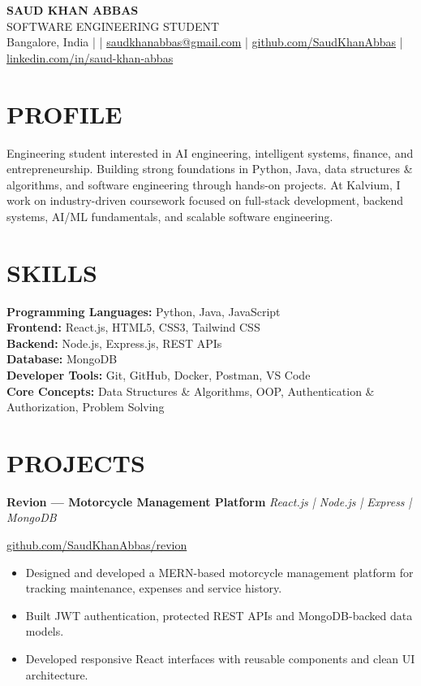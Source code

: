 \documentclass[11pt,a4paper]{article}
\begin{document}
\begin{center}
{\LARGE\bfseries SAUD KHAN ABBAS}\\[3pt]
{\large SOFTWARE ENGINEERING STUDENT}\\[7pt]

Bangalore, India \;| \;|\;
\href{mailto:saudkhanabbas@gmail.com}{saudkhanabbas@gmail.com}
\;|\;
\href{https://github.com/SaudKhanAbbas}{github.com/SaudKhanAbbas}
\;|\;
\href{https://linkedin.com/in/saud-khan-abbas}{linkedin.com/in/saud-khan-abbas}
\end{center}

\section*{PROFILE}
Engineering student interested in AI engineering, intelligent systems, finance, and entrepreneurship. Building strong foundations in Python, Java, data structures \& algorithms, and software engineering through hands-on projects. At Kalvium, I work on industry-driven coursework focused on full-stack development, backend systems, AI/ML fundamentals, and scalable software engineering.

\section*{SKILLS}
\textbf{Programming Languages:} Python, Java, JavaScript\\
\textbf{Frontend:} React.js, HTML5, CSS3, Tailwind CSS\\
\textbf{Backend:} Node.js, Express.js, REST APIs\\
\textbf{Database:} MongoDB\\
\textbf{Developer Tools:} Git, GitHub, Docker, Postman, VS Code\\
\textbf{Core Concepts:} Data Structures \& Algorithms, OOP, Authentication \& Authorization, Problem Solving

\section*{PROJECTS}

\textbf{Revion — Motorcycle Management Platform} \hfill \textit{React.js | Node.js | Express | MongoDB}

\href{https://github.com/SaudKhanAbbas/revion}{github.com/SaudKhanAbbas/revion}

\begin{itemize}
\item Designed and developed a MERN-based motorcycle management platform for tracking maintenance, expenses and service history.
\item Built JWT authentication, protected REST APIs and MongoDB-backed data models.
\item Developed responsive React interfaces with reusable components and clean UI architecture.
\end{itemize}
\end{document}
